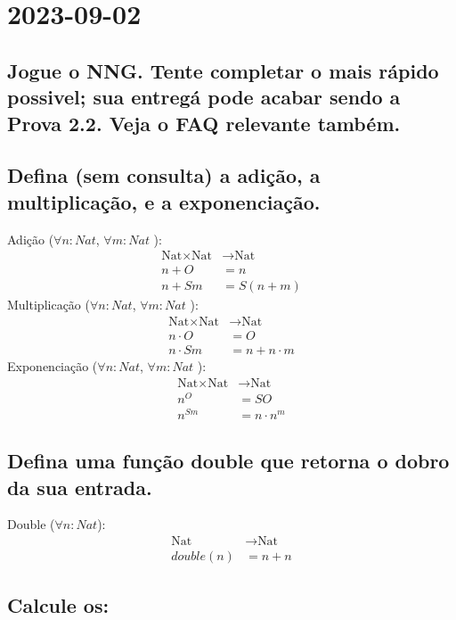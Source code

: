 \documentclass[a4paper, 12pt]{article}
\begin{document}
\section{2023-09-02}

\subsection*{Jogue o NNG. Tente completar o mais rápido possivel; sua entregá pode acabar sendo a Prova 2.2. Veja o FAQ relevante também.}

\subsection*{Defina (sem consulta) a adição, a multiplicação, e a exponenciação.}
%
Adição ($\forall n:Nat$, $\forall m:Nat$ ):
\begin{align*}
    \text{Nat} \times \text{Nat} &\to \text{Nat}\\
    n + O &= n \tag*{[a.1]}\\
    n + Sm &= S(n + m) \tag*{[a.2]}
\end{align*}
%
Multiplicação ($\forall n:Nat$, $\forall m:Nat$ ):
\begin{align*}
    \text{Nat} \times \text{Nat} &\to \text{Nat}\\
    n \cdot O &= O \tag*{[m.1]}\\
    n \cdot Sm &= n + n \cdot m \tag*{[m.2]}
\end{align*}
%
Exponenciação ($\forall n:Nat$, $\forall m:Nat$ ):
\begin{align*}
    \text{Nat} \times \text{Nat} &\to \text{Nat}\\
    n^O &= SO \tag*{[e.1]}\\
    n^{Sm} &= n \cdot n^m \tag*{[e.2]}
\end{align*}

\subsection*{Defina uma função double que retorna o dobro da sua entrada.}
%
Double ($\forall n:Nat$):
\begin{align*}
    \text{Nat} &\to \text{Nat}\\
    double(n) &= n + n \tag*{[d.1]}
\end{align*}
%
\subsection*{Calcule os:}
%
\end{document}
